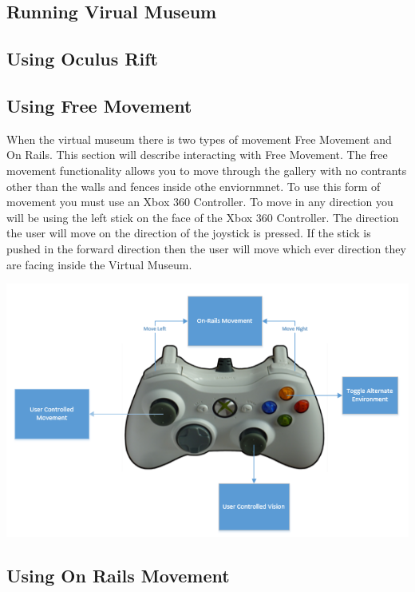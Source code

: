 \subsection{Running Virual Museum}

\subsection{Using Oculus Rift}

\subsection{Using Free Movement}

When the virtual museum there is two types of movement Free Movement and On Rails. This section will describe interacting with Free Movement. The free movement functionality allows you to move through the gallery with no contrants other than the walls and fences inside othe enviornmnet. To use this form of movement you must use an Xbox 360 Controller. To move in any direction you will be using the left stick on the face of the Xbox 360 Controller. The direction the user will move on the direction of the joystick is pressed. If the stick is pushed in the forward direction then the user will move which ever direction they are facing inside the Virtual Museum.

\includegraphics[scale=0.75]{Diagrams/XboxControlDiagram.png}\\

\subsection{Using On Rails Movement}

